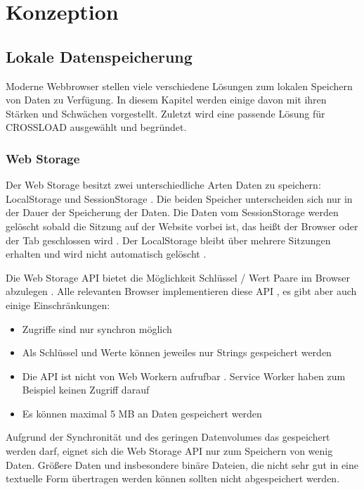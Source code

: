 \chapter{Konzeption}
\label{Kap4}

\section{Lokale Datenspeicherung}
Moderne Webbrowser stellen viele verschiedene Lösungen zum lokalen Speichern von Daten zu Verfügung. In diesem Kapitel werden einige davon mit ihren Stärken und Schwächen vorgestellt. Zuletzt wird eine passende Lösung für CROSSLOAD ausgewählt und begründet.

\subsection{Web Storage}
Der Web Storage besitzt zwei unterschiedliche Arten Daten zu speichern: LocalStorage und SessionStorage \autocite{Hajian2019} \autocite{mdn-web-storage}. Die beiden Speicher unterscheiden sich nur in der Dauer der Speicherung der Daten. Die Daten vom SessionStorage werden gelöscht sobald die Sitzung auf der Website vorbei ist, das heißt der Browser oder der Tab geschlossen wird \autocite{Hajian2019} \autocite{mdn-web-storage}. Der LocalStorage bleibt über mehrere Sitzungen erhalten und wird nicht automatisch gelöscht \autocite{Hajian2019} \autocite{mdn-web-storage}. 

Die Web Storage \ac{API} bietet die Möglichkeit Schlüssel / Wert Paare im Browser abzulegen \autocite{mdn-web-storage}. Alle relevanten Browser implementieren diese \ac{API} \autocite{mdn-web-storage}, es gibt aber auch einige Einschränkungen:

\begin{itemize}
	\item Zugriffe sind nur synchron möglich \autocite{Hajian2019}
	\item Als Schlüssel und Werte können jeweiles nur Strings gespeichert werden \autocite{Hajian2019}
	\item Die \ac{API} ist nicht von Web Workern aufrufbar \autocite{Hajian2019}. Service Worker haben zum Beispiel keinen Zugriff darauf
	\item Es können maximal 5 \ac{MB} an Daten gespeichert werden \autocite{mdn-web-storage}
\end{itemize}

Aufgrund der Synchronität und des geringen Datenvolumes das gespeichert werden darf, eignet sich die Web Storage \ac{API} nur zum Speichern von wenig Daten. Größere Daten und insbesondere binäre Dateien, die nicht sehr gut in eine textuelle Form übertragen werden können sollten nicht abgespeichert werden. 

